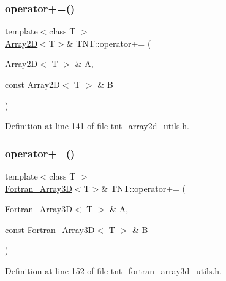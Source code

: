 \mbox{\label{namespaceTNT_a613b54428f9d71ec88bba64f0b1b2956}} 
\subsubsection{\texorpdfstring{operator+=()}{operator+=()}\hspace{0.1cm}{\footnotesize\ttfamily [4/5]}}
{\footnotesize\ttfamily template$<$class T $>$ \\
\hyperlink{classTNT_1_1Array2D}{Array2D}$<$T$>$\& T\+N\+T\+::operator+= (\begin{DoxyParamCaption}\item[{\hyperlink{classTNT_1_1Array2D}{Array2D}$<$ T $>$ \&}]{A,  }\item[{const \hyperlink{classTNT_1_1Array2D}{Array2D}$<$ T $>$ \&}]{B }\end{DoxyParamCaption})}



Definition at line 141 of file tnt\+\_\+array2d\+\_\+utils.\+h.

\mbox{\label{namespaceTNT_ac38073ccc2a38c912215dc2e607f1e7d}} 
\subsubsection{\texorpdfstring{operator+=()}{operator+=()}\hspace{0.1cm}{\footnotesize\ttfamily [5/5]}}
{\footnotesize\ttfamily template$<$class T $>$ \\
\hyperlink{classTNT_1_1Fortran__Array3D}{Fortran\+\_\+\+Array3D}$<$T$>$\& T\+N\+T\+::operator+= (\begin{DoxyParamCaption}\item[{\hyperlink{classTNT_1_1Fortran__Array3D}{Fortran\+\_\+\+Array3D}$<$ T $>$ \&}]{A,  }\item[{const \hyperlink{classTNT_1_1Fortran__Array3D}{Fortran\+\_\+\+Array3D}$<$ T $>$ \&}]{B }\end{DoxyParamCaption})}



Definition at line 152 of file tnt\+\_\+fortran\+\_\+array3d\+\_\+utils.\+h.

\mbox{\label{namespaceTNT_a322eb831bd13a3a44822b1351d6f601e}} 
